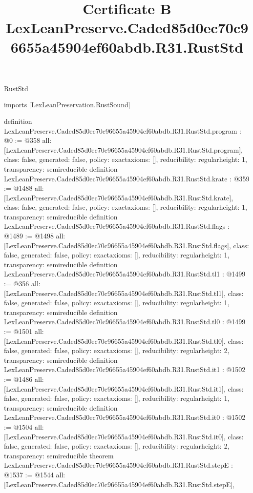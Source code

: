 \begin{lexlean}{RustStd}
\title{Certificate B LexLeanPreserve.Caded85d0ec70c96655a45904ef60abdb.R31.RustStd}
\begin{coremodule}
imports [LexLeanPreservation.RustSound]

definition LexLeanPreserve.Caded85d0ec70c96655a45904ef60abdb.R31.RustStd.program : @0 := @358 {
  all: [LexLeanPreserve.Caded85d0ec70c96655a45904ef60abdb.R31.RustStd.program],
  class: false,
  generated: false,
  policy: exact{axioms: []},
  reducibility: regular{height: 1},
  transparency: semireducible
}
definition LexLeanPreserve.Caded85d0ec70c96655a45904ef60abdb.R31.RustStd.krate : @359 := @1488 {
  all: [LexLeanPreserve.Caded85d0ec70c96655a45904ef60abdb.R31.RustStd.krate],
  class: false,
  generated: false,
  policy: exact{axioms: []},
  reducibility: regular{height: 1},
  transparency: semireducible
}
definition LexLeanPreserve.Caded85d0ec70c96655a45904ef60abdb.R31.RustStd.flags : @1489 := @1498 {
  all: [LexLeanPreserve.Caded85d0ec70c96655a45904ef60abdb.R31.RustStd.flags],
  class: false,
  generated: false,
  policy: exact{axioms: []},
  reducibility: regular{height: 1},
  transparency: semireducible
}
definition LexLeanPreserve.Caded85d0ec70c96655a45904ef60abdb.R31.RustStd.tl1 : @1499 := @356 {
  all: [LexLeanPreserve.Caded85d0ec70c96655a45904ef60abdb.R31.RustStd.tl1],
  class: false,
  generated: false,
  policy: exact{axioms: []},
  reducibility: regular{height: 1},
  transparency: semireducible
}
definition LexLeanPreserve.Caded85d0ec70c96655a45904ef60abdb.R31.RustStd.tl0 : @1499 := @1501 {
  all: [LexLeanPreserve.Caded85d0ec70c96655a45904ef60abdb.R31.RustStd.tl0],
  class: false,
  generated: false,
  policy: exact{axioms: []},
  reducibility: regular{height: 2},
  transparency: semireducible
}
definition LexLeanPreserve.Caded85d0ec70c96655a45904ef60abdb.R31.RustStd.it1 : @1502 := @1486 {
  all: [LexLeanPreserve.Caded85d0ec70c96655a45904ef60abdb.R31.RustStd.it1],
  class: false,
  generated: false,
  policy: exact{axioms: []},
  reducibility: regular{height: 1},
  transparency: semireducible
}
definition LexLeanPreserve.Caded85d0ec70c96655a45904ef60abdb.R31.RustStd.it0 : @1502 := @1504 {
  all: [LexLeanPreserve.Caded85d0ec70c96655a45904ef60abdb.R31.RustStd.it0],
  class: false,
  generated: false,
  policy: exact{axioms: []},
  reducibility: regular{height: 2},
  transparency: semireducible
}
theorem LexLeanPreserve.Caded85d0ec70c96655a45904ef60abdb.R31.RustStd.stepE : @1537 := @1544 {
  all: [LexLeanPreserve.Caded85d0ec70c96655a45904ef60abdb.R31.RustStd.stepE],
}
\end{coremodule}
\end{lexlean}
